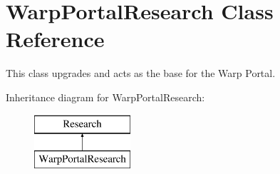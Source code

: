 \hypertarget{class_warp_portal_research}{}\section{Warp\+Portal\+Research Class Reference}
\label{class_warp_portal_research}


This class upgrades and acts as the base for the Warp Portal.  


Inheritance diagram for Warp\+Portal\+Research\+:\begin{figure}[H]
\begin{center}
\leavevmode
\includegraphics[height=2.000000cm]{class_warp_portal_research}
\end{center}
\end{figure}
